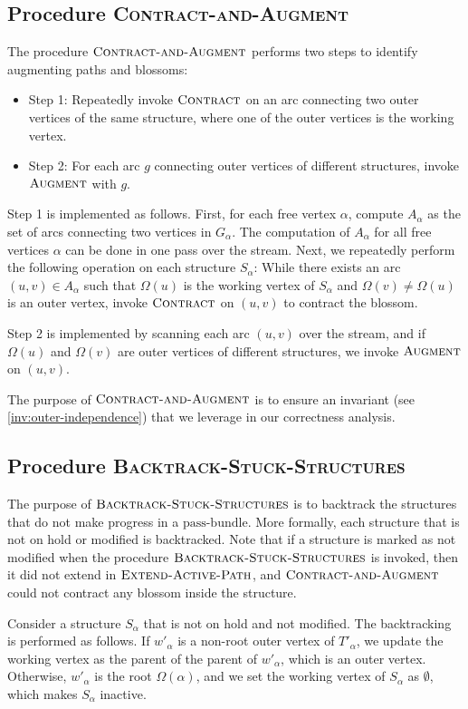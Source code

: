 \documentclass{article}
\newcommand{\alp}{\alpha}
\newcommand{\Omg}{\Omega}
\newcommand{\bundle}{\text{pass-bundle}\xspace}
\newcommand{\algExtend}{\textsc{Extend-Active-Path}\xspace}
\newcommand{\algBacktrack}{\textsc{Backtrack-Stuck-Structures}\xspace}
\newcommand{\algAugment}{\textsc{Augment}\xspace}
\newcommand{\algContract}{\textsc{Contract}\xspace}
\newcommand{\algCheck}{\textsc{Contract-and-Augment}\xspace}
\begin{document}
\subsection{Procedure \algCheck} \label{sec:check}
The procedure $\algCheck$ performs two steps to identify augmenting paths and blossoms:

\begin{itemize}
    \item[] Step 1: Repeatedly invoke $\algContract$ on an arc connecting two outer vertices of the same structure, where one of the outer vertices is the working vertex.
    \item[] Step 2: For each arc $g$ connecting outer vertices of different structures, invoke $\algAugment$ with $g$.
\end{itemize}

Step 1 is implemented as follows.
First, for each free vertex $\alp$, compute $A_\alp$ as the set of arcs connecting two vertices in $G_\alp$.
The computation of $A_\alp$ for all free vertices $\alp$ can be done in one pass over the stream.
Next, we repeatedly perform the following operation on each structure $S_\alp$:
While there exists an arc $(u, v) \in A_\alp$ such that $\Omg(u)$ is the working vertex of $S_\alp$ and $\Omg(v) \neq \Omg(u)$ is an outer vertex, invoke $\algContract$ on $(u, v)$ to contract the blossom.

Step 2 is implemented by scanning each arc $(u, v)$ over the stream, and if $\Omg(u)$ and $\Omg(v)$ are outer vertices of different structures, we invoke $\algAugment$ on $(u, v)$.

The purpose of $\algCheck$ is to ensure an invariant (see \cref{inv:outer-independence}) that we leverage in our correctness analysis.


\subsection{Procedure \algBacktrack} \label{sec:backtrack}
The purpose of $\algBacktrack$ is to backtrack the structures that do not make progress in a $\bundle$. More formally, each structure that is not on hold or modified is backtracked. 
Note that if a structure is marked as not modified when the procedure $\algBacktrack$ is invoked, then it did not extend in $\algExtend$, and $\algCheck$ could not contract any blossom inside the structure.

Consider a structure $S_\alp$ that is not on hold and not modified. The backtracking is performed as follows.
If $w'_\alp$ is a non-root outer vertex of $T'_\alp$, we update the working vertex as the parent of the parent of $w'_\alp$, which is an outer vertex.
Otherwise, $w'_\alp$ is the root $\Omg(\alp)$, and we set the working vertex of $S_\alp$ as $\emptyset$, which makes $S_\alp$ inactive.
\end{document}
